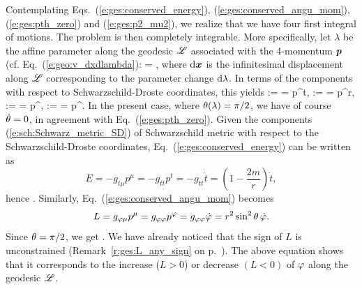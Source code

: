Contemplating Eqs.~(\ref{e:ges:conserved_energy}), (\ref{e:ges:conserved_angu_mom}),
(\ref{e:ges:pth_zero}) and (\ref{e:ges:p2_mu2}), we realize that we have
four first integral of motions. The problem is then completely integrable.
More specifically, let $\lambda$ be the affine parameter along the geodesic
$\mathscr{L}$ associated with the 4-momentum $\bm{p}$ (cf. Eq.~(\ref{e:geo:v_dxdlambda}):
\be
     =  ,
\ee
where  $\mathrm{d}\bm{x}$ is the infinitesimal displacement along $\mathscr{L}$ corresponding
to the parameter change $\mathrm{d}\lambda$.
In terms of the components with respect to Schwarzschild-Droste coordinates,
this yields
\be \label{e:ges:comp_4_momentum}
     :=  = p^t,\qquad
     :=  = p^r,\qquad
    \dot{\th} := \frac{\D \th}{\D\lambda} = p^\th,\qquad
    \dot{\ph} := \frac{\D \ph}{\D\lambda} = p^\ph .
\ee
In the present case, where $\theta(\lambda)=\pi/2$, we have of course $\dot{\theta}=0$,
in agreement with Eq.~(\ref{e:ges:pth_zero}).
Given the components (\ref{e:sch:Schwarz_metric_SD}) of Schwarzschild metric
with respect to the Schwarzschild-Droste coordinates,
Eq.~(\ref{e:ges:conserved_energy}) can be written as
\[
    E = - g_{t\mu} p^\mu = - g_{tt} p^t = - g_{tt} \dot{t}
    = \left(1 - \frac{2m}{r} \right) \dot{t} ,
\]
hence
\be \label{e:ges:dot_t}
    .
\ee
Similarly, Eq.~(\ref{e:ges:conserved_angu_mom}) becomes
\[
    L = g_{\varphi\mu} p^\mu = g_{\varphi\varphi} p^\varphi  = g_{\varphi\varphi} \dot{\varphi}
        = r^2 \sin^2\theta \, \dot{\varphi} .
\]
Since $\theta=\pi/2$, we get
\be \label{e:ges:dot_ph}
     .
\ee
We have already noticed that the sign of $L$ is unconstrained (Remark~\ref{r:ges:L_any_sign} on p.~\pageref{r:ges:L_any_sign}). The above equation
shows that it corresponds to the increase ($L>0$) or decrease $(L<0)$
of $\varphi$ along the geodesic $\mathscr{L}$.

